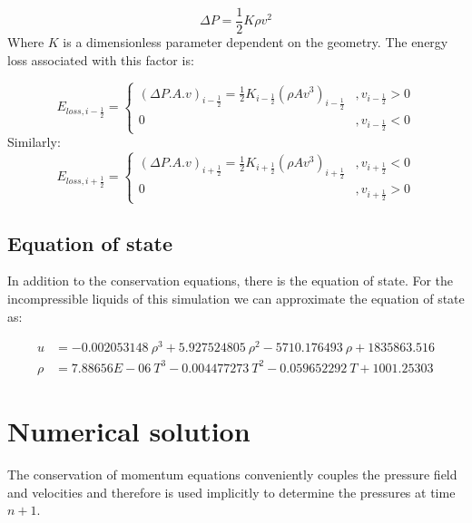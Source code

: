 \documentclass[11pt,letterpaper,titlepage]{article}
\newcommand{\half}{\frac{1}{2}}
\begin{document}
\begin{equation*}
\Delta P = \half K \rho  v^2
\end{equation*}
\newline
\noindent Where $K$ is a dimensionless parameter dependent on the geometry. The energy loss associated with this factor is:

\begin{equation*}
E_{loss,i-\half}=
\begin{cases}
(\Delta P.A.v)_{i-\half} = \half  K_{i-\half} (\rho A v^3)_{i-\half}     &,v_{i-\half}>0 \\
0    &,v_{i-\half}<0
\end{cases}
\end{equation*}
\newline
\noindent Similarly:
\begin{equation*}
E_{loss,i+\half}=
\begin{cases}
(\Delta P.A.v)_{i+\half} = \half  K_{i+\half} (\rho A v^3)_{i+\half}     &,v_{i+\half}<0 \\
0    &,v_{i+\half}>0
\end{cases}
\end{equation*}


\subsection{Equation of state}
In addition to the conservation equations, there is the equation of state. For the incompressible liquids of this simulation we can approximate the equation of state as:

\begin{equation}
\begin{aligned}
u&=-0.002053148 \ \rho^3+5.927524805 \ \rho^2-5710.176493 \ \rho+1835863.516 \\
\rho&=7.88656E-06 \ T^3-0.004477273 \ T^2-0.059652292 \ T+1001.25303
\end{aligned}
\end{equation}





\newpage
{}
\section{Numerical solution}
The conservation of momentum equations conveniently couples the pressure field and velocities and therefore is used implicitly to determine the pressures at time $n+1$.
\end{document}
